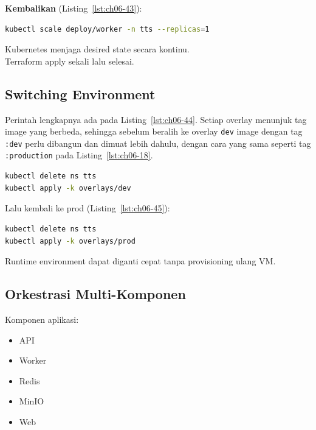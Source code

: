 \textbf{Kembalikan} (Listing~\ref{lst:ch06-43}):

\begin{lstlisting}[language=bash, caption={Mengubah objek Kubernetes (5)}, label={lst:ch06-43}]
kubectl scale deploy/worker -n tts --replicas=1
\end{lstlisting}

Kubernetes menjaga desired state secara kontinu. \\
Terraform apply sekali lalu selesai.

\subsection{Switching Environment} Perintah lengkapnya ada pada Listing~\ref{lst:ch06-44}.
Setiap overlay menunjuk tag image yang berbeda, sehingga sebelum beralih ke
overlay \texttt{dev} image dengan tag \texttt{:dev} perlu dibangun dan dimuat
lebih dahulu, dengan cara yang sama seperti tag \texttt{:production} pada
Listing~\ref{lst:ch06-18}.

\begin{lstlisting}[language=bash, caption={Mengubah objek Kubernetes (6)}, label={lst:ch06-44}]
kubectl delete ns tts
kubectl apply -k overlays/dev
\end{lstlisting}

Lalu kembali ke prod (Listing~\ref{lst:ch06-45}):

\begin{lstlisting}[language=bash, caption={Mengubah objek Kubernetes (7)}, label={lst:ch06-45}]
kubectl delete ns tts
kubectl apply -k overlays/prod
\end{lstlisting}

Runtime environment dapat diganti cepat tanpa provisioning ulang VM.

\subsection{Orkestrasi Multi-Komponen}

Komponen aplikasi:

\begin{itemize}
    \item API
    \item Worker
    \item Redis
    \item MinIO
    \item Web
\end{itemize}

